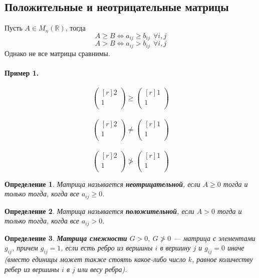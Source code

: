 \documentclass[12pt]{article}
\newtheorem*{definition}{Определение}
\begin{document}
	\subsection{Положительные и неотрицательные матрицы}
	Пусть $A\in M_n(\mathbb{R})$, тогда
	$$A\geqslant B \Leftrightarrow a_{ij}\geqslant b_{ij} ~~\forall i, j$$
	$$A> B \Leftrightarrow a_{ij}> b_{ij} ~~\forall i, j$$
	Однако не все матрицы сравнимы.\\
	\\
	\textbf{Пример 1.}\\ \\
	\[\begin{pmatrix}[r]
	2\\
	1\\
	\end{pmatrix}\geqslant \begin{pmatrix}[r]
	1\\
	1\\
	\end{pmatrix}\]\\
	\[\begin{pmatrix}[r]
	2\\
	1\\
	\end{pmatrix}\neq \begin{pmatrix}[r]
	1\\
	1\\
	\end{pmatrix}\]\\
	\[\begin{pmatrix}[r]
	2\\
	1\\
	\end{pmatrix}\ngtr \begin{pmatrix}[r]
	1\\
	1\\
	\end{pmatrix}\]
	\begin{definition}
		Матрица называется \textbf{неотрицательной}, если $A\geqslant 0$ тогда и только тогда, когда все $a_{ij}\geqslant 0$.
	\end{definition}
	\begin{definition}
		Матрица называется \textbf{положительной}, если $A> 0$ тогда и только тогда, когда все $a_{ij}> 0$.
	\end{definition}
	\begin{definition}
		\textbf{Матрица смежности} $G>0,~G\ngtr 0$ --- матрица с элементами $g_{ij}$, причем $g_{ij}=1$, если есть ребро из вершины $i$ в вершину $j$ и $g_{ij}=0$ иначе (вместо единицы может также стоять какое-либо число $k$, равное количеству ребер из вершины $i$ в $j$ или весу ребра).
	\end{definition}
\end{document}
